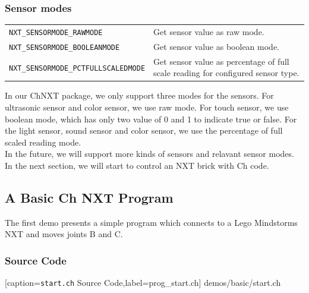 \documentclass[11pt]{article}
\begin{document}
\subsubsection*{Sensor modes}
\begin{longtable}{p{6cm}p{9.5cm}}
    \hline
    {\tt NXT\_SENSORMODE\_RAWMODE}          &Get sensor value as raw mode.\\	 
    {\tt NXT\_SENSORMODE\_BOOLEANMODE}      &Get sensor value as boolean mode.\\
    {\tt NXT\_SENSORMODE\_PCTFULLSCALEDMODE}&Get sensor value as percentage of 
    full scale reading for configured sensor type.\\
    \hline
\end{longtable}
In our ChNXT package, we only support three modes for the sensors. For ultrasonic 
sensor and color sensor, we use raw mode. For touch sensor, we 
use boolean mode, which has only two value of 0 and 1 to indicate true or false. 
For the light sensor, sound sensor and color sensor, we use the percentage of 
full scaled reading mode.\\

In the future, we will support more kinds of sensors and relavant sensor modes.
In the next section, we will start to control an NXT brick with Ch code.

\subsection{\label{sec:basic_demo}A Basic Ch NXT Program}
The first demo presents a simple program which connects to a Lego Mindstorms NXT 
and moves joints B and C.

\subsubsection*{Source Code}

    [caption={{\tt start.ch} Source Code},label=prog_start.ch]
    {demos/basic/start.ch}
\end{document}
